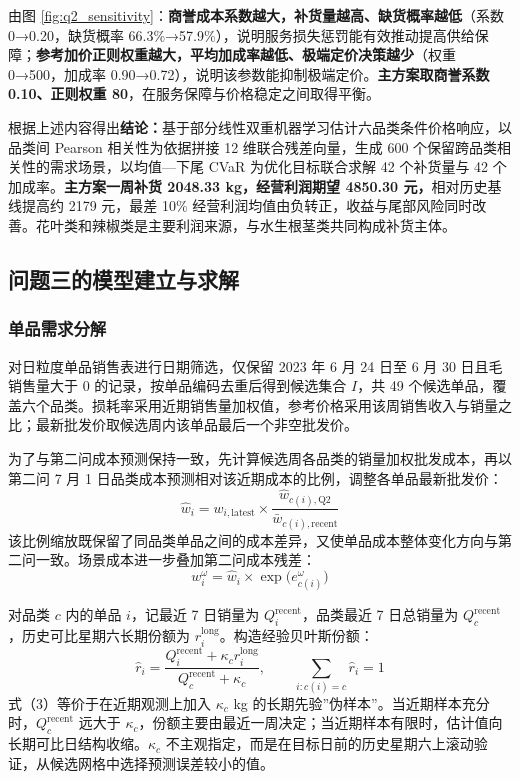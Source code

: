 \documentclass[withoutpreface,bwprint]{cumcmthesis} %
\numberwithin{equation}{section}
\begin{document}
\begin{enumerate}
\hspace*{2em}
由图 \ref{fig:q2_sensitivity}：\textbf{商誉成本系数越大，补货量越高、缺货概率越低}（系数 0→0.20，缺货概率 66.3\%→57.9\%），说明服务损失惩罚能有效推动提高供给保障；\textbf{参考加价正则权重越大，平均加成率越低、极端定价决策越少}（权重 0→500，加成率 0.90→0.72），说明该参数能抑制极端定价。\textbf{主方案取商誉系数 0.10、正则权重 80}，在服务保障与价格稳定之间取得平衡。

\hspace*{2em}
根据上述内容得出\textbf{结论：}基于部分线性双重机器学习估计六品类条件价格响应，以品类间 Pearson 相关性为依据拼接 12 维联合残差向量，生成 600 个保留跨品类相关性的需求场景，以均值—下尾 CVaR 为优化目标联合求解 42 个补货量与 42 个加成率。\textbf{主方案一周补货 2048.33 kg，经营利润期望 4850.30 元，}相对历史基线提高约 2179 元，最差 10\% 经营利润均值由负转正，收益与尾部风险同时改善。花叶类和辣椒类是主要利润来源，与水生根茎类共同构成补货主体。

\end{enumerate}

\subsection{问题三的模型建立与求解}
\subsubsection{单品需求分解}

对日粒度单品销售表进行日期筛选，仅保留 2023 年 6 月 24 日至 6 月 30 日且毛销售量大于 0 的记录，按单品编码去重后得到候选集合 $I$，共 49 个候选单品，覆盖六个品类。损耗率采用近期销售量加权值，参考价格采用该周销售收入与销量之比；最新批发价取候选周内该单品最后一个非空批发价。

为了与第二问成本预测保持一致，先计算候选周各品类的销量加权批发成本，再以第二问 7 月 1 日品类成本预测相对该近期成本的比例，调整各单品最新批发价：
\begin{equation}
    \hat{w}_i = w_{i,\mathrm{latest}} \times \frac{\hat{w}_{c(i),\mathrm{Q2}}}{\bar{w}_{c(i),\mathrm{recent}}}
\end{equation}
该比例缩放既保留了同品类单品之间的成本差异，又使单品成本整体变化方向与第二问一致。场景成本进一步叠加第二问成本残差：
\begin{equation}
    w_i^{\omega} = \hat{w}_i \times \exp\bigl(e_{c(i)}^{\omega}\bigr)
\end{equation}

对品类 $c$ 内的单品 $i$，记最近 7 日销量为 $Q_i^{\mathrm{recent}}$，品类最近 7 日总销量为 $Q_c^{\mathrm{recent}}$，历史可比星期六长期份额为 $r_i^{\mathrm{long}}$。构造经验贝叶斯份额：
\begin{equation}
    \hat{r}_i = \frac{Q_i^{\mathrm{recent}} + \kappa_c r_i^{\mathrm{long}}}{Q_c^{\mathrm{recent}} + \kappa_c},\qquad \sum_{i:c(i)=c}\hat{r}_i = 1
\end{equation}
式（3）等价于在近期观测上加入 $\kappa_c$ kg 的长期先验''伪样本''。当近期样本充分时，$Q_c^{\mathrm{recent}}$ 远大于 $\kappa_c$，份额主要由最近一周决定；当近期样本有限时，估计值向长期可比日结构收缩。$\kappa_c$ 不主观指定，而是在目标日前的历史星期六上滚动验证，从候选网格中选择预测误差较小的值。
\end{document}
